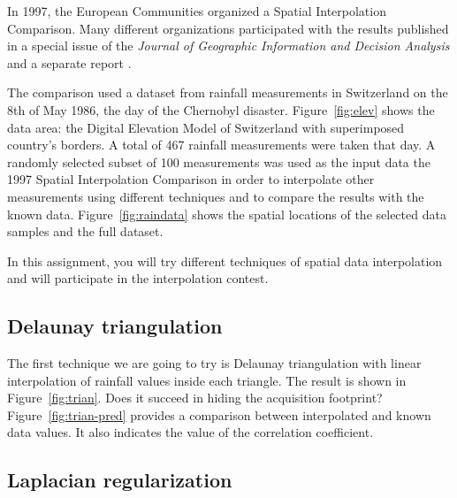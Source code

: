 In 1997, the European Communities organized a Spatial Interpolation
Comparison. Many different organizations participated with the results
published in a special issue of the \emph{Journal of Geographic
Information and Decision Analysis} \cite[]{dubois} and a separate
report \cite[]{rain}.


The comparison used a dataset from rainfall measurements in
Switzerland on the 8th of May 1986, the day of the Chernobyl disaster.
Figure~\ref{fig:elev} shows the data area: the Digital Elevation Model
of Switzerland with superimposed country's borders.  A total of 467
rainfall measurements were taken that day. A randomly selected subset
of 100 measurements was used as the input data the 1997 Spatial
Interpolation Comparison in order to interpolate other measurements
using different techniques and to compare the results with the known
data. Figure~\ref{fig:raindata} shows the spatial locations of the
selected data samples and the full dataset.


In this assignment, you will try different techniques of spatial data
interpolation and will participate in the interpolation contest.

\subsection{Delaunay triangulation}

The first technique we are going to try is Delaunay triangulation with
linear interpolation of rainfall values inside each triangle. The
result is shown in Figure~\ref{fig:trian}. Does it succeed in hiding
the acquisition footprint? Figure~\ref{fig:trian-pred} provides a
comparison between interpolated and known data values. It also
indicates the value of the correlation coefficient.


\subsection{Laplacian regularization}

